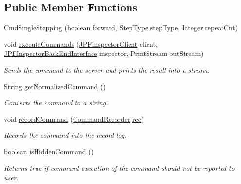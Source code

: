 \subsection*{Public Member Functions}
\begin{DoxyCompactItemize}
\item 
\hyperlink{classgov_1_1nasa_1_1jpf_1_1inspector_1_1client_1_1commands_1_1_cmd_single_stepping_aa2e0b46adf8cd799de1d6e9d83b789a8}{Cmd\+Single\+Stepping} (boolean \hyperlink{classgov_1_1nasa_1_1jpf_1_1inspector_1_1client_1_1commands_1_1_cmd_single_stepping_af3bd26b0ee3e4a353b369b84e61db07c}{forward}, \hyperlink{enumgov_1_1nasa_1_1jpf_1_1inspector_1_1interfaces_1_1_commands_interface_1_1_step_type}{Step\+Type} \hyperlink{classgov_1_1nasa_1_1jpf_1_1inspector_1_1client_1_1commands_1_1_cmd_single_stepping_a9888f2543c87e6e21a850b215d79b389}{step\+Type}, Integer repeat\+Cnt)
\item 
void \hyperlink{classgov_1_1nasa_1_1jpf_1_1inspector_1_1client_1_1commands_1_1_cmd_single_stepping_a812e5e8ea5338332acd477398a8e5397}{execute\+Commands} (\hyperlink{classgov_1_1nasa_1_1jpf_1_1inspector_1_1client_1_1_j_p_f_inspector_client}{J\+P\+F\+Inspector\+Client} client, \hyperlink{interfacegov_1_1nasa_1_1jpf_1_1inspector_1_1interfaces_1_1_j_p_f_inspector_back_end_interface}{J\+P\+F\+Inspector\+Back\+End\+Interface} inspector, Print\+Stream out\+Stream)
\begin{DoxyCompactList}\small\item\em Sends the command to the server and prints the result into a stream. \end{DoxyCompactList}\item 
String \hyperlink{classgov_1_1nasa_1_1jpf_1_1inspector_1_1client_1_1commands_1_1_cmd_single_stepping_ae755b5e03f36a6ee1e62e66168e5aa5a}{get\+Normalized\+Command} ()
\begin{DoxyCompactList}\small\item\em Converts the command to a string. \end{DoxyCompactList}\item 
void \hyperlink{classgov_1_1nasa_1_1jpf_1_1inspector_1_1client_1_1_client_command_ae0670332ec750bc5b9016d0b04d8adfe}{record\+Command} (\hyperlink{classgov_1_1nasa_1_1jpf_1_1inspector_1_1client_1_1_command_recorder}{Command\+Recorder} \hyperlink{classgov_1_1nasa_1_1jpf_1_1inspector_1_1client_1_1_client_command_af4246f2427035c72a6af45a2c61361f7}{rec})
\begin{DoxyCompactList}\small\item\em Records the command into the record log. \end{DoxyCompactList}\item 
boolean \hyperlink{classgov_1_1nasa_1_1jpf_1_1inspector_1_1client_1_1_client_command_afb09c400c64e2d8e01059b91ff847761}{is\+Hidden\+Command} ()
\begin{DoxyCompactList}\small\item\em Returns true if command execution of the command should not be reported to user. \end{DoxyCompactList}\end{DoxyCompactItemize}
